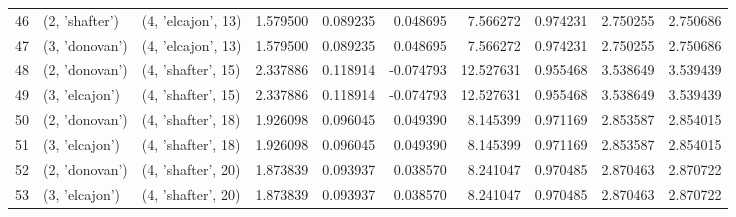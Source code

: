 \begin{tabular}{lllrrrrrrr}
46 &   (2, 'shafter') &  (4, 'elcajon', 13) &  1.579500 &  0.089235 &  0.048695 &   7.566272 &  0.974231 &  2.750255 &  2.750686 \\
47 &   (3, 'donovan') &  (4, 'elcajon', 13) &  1.579500 &  0.089235 &  0.048695 &   7.566272 &  0.974231 &  2.750255 &  2.750686 \\
48 &   (2, 'donovan') &  (4, 'shafter', 15) &  2.337886 &  0.118914 & -0.074793 &  12.527631 &  0.955468 &  3.538649 &  3.539439 \\
49 &   (3, 'elcajon') &  (4, 'shafter', 15) &  2.337886 &  0.118914 & -0.074793 &  12.527631 &  0.955468 &  3.538649 &  3.539439 \\
50 &   (2, 'donovan') &  (4, 'shafter', 18) &  1.926098 &  0.096045 &  0.049390 &   8.145399 &  0.971169 &  2.853587 &  2.854015 \\
51 &   (3, 'elcajon') &  (4, 'shafter', 18) &  1.926098 &  0.096045 &  0.049390 &   8.145399 &  0.971169 &  2.853587 &  2.854015 \\
52 &   (2, 'donovan') &  (4, 'shafter', 20) &  1.873839 &  0.093937 &  0.038570 &   8.241047 &  0.970485 &  2.870463 &  2.870722 \\
53 &   (3, 'elcajon') &  (4, 'shafter', 20) &  1.873839 &  0.093937 &  0.038570 &   8.241047 &  0.970485 &  2.870463 &  2.870722 \\
\bottomrule
\end{tabular}
